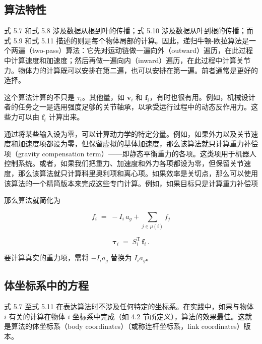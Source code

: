 \documentclass[10pt,a4paper]{book}
\theoremstyle{thmstyle} %
\theoremstyle{defstyle} %
\theoremstyle{prostyle} %
\begin{document}
\subsection{算法特性}





式 5.7 和式 5.8 涉及数据从根到叶的传播；式 5.10 涉及数据从叶到根的传播；而式 5.9 和式 5.11 描述的则是每个物体局部的计算。因此，递归牛顿-欧拉算法是一个两遍（two-pass）算法：它先对运动链做一遍向外（outward）遍历，在此过程中计算速度和加速度；然后再做一遍向内（inward）遍历，在此过程中计算关节力。物体力的计算既可以安排在第二遍，也可以安排在第一遍。前者通常是更好的选择。



这个算法计算的不只是 $\tau_{i}$。其他量，如 $\boldsymbol{v}_{i}$ 和 $\boldsymbol{f}_{i}$，有时也很有用。例如，机械设计者的任务之一是选用强度足够的关节轴承，以承受运行过程中的动态反作用力。这些力可以由 $\boldsymbol{f}_{i}$ 计算出来。



通过将某些输入设为零，可以计算动力学的特定分量。例如，如果外力以及关节速度和加速度项都设为零，但保留虚拟的基体加速度，那么该算法就只计算重力补偿项（gravity compensation term）——即静态平衡重力的各项。这类项用于机器人控制系统。或者，如果我们把重力、加速度和外力各项都设为零，但保留关节速度，那么该算法就只计算科里奥利项和离心项。如果效率是关切点，那么可以使用该算法的一个精简版本来完成这些专门计算。例如，如果目标只是计算重力补偿项



那么算法就简化为



$$
f _ { i } \; = \; - I _ { i } \, a _ { g } + \sum _ { j \in \mu ( i ) } f _ { j }
$$



$$
\boldsymbol { \tau } _ { i } \; = \; S _ { i } ^{\mathrm { T} } \, \boldsymbol { f } _ { i } \, .
$$



要计算真实的重力项，需将 $-I_{i}a_{g}$ 替换为 $I_{i}a_{g}$。



\subsection{体坐标系中的方程}





式 5.7 至式 5.11 在表达算法时不涉及任何特定的坐标系。在实践中，如果与物体 $i$ 有关的计算在物体 $i$ 坐标系中完成（如 4.2 节所定义），算法的效果最佳。这就是算法的体坐标系（body coordinates）（或称连杆坐标系，link coordinates）版本。
\end{document}
